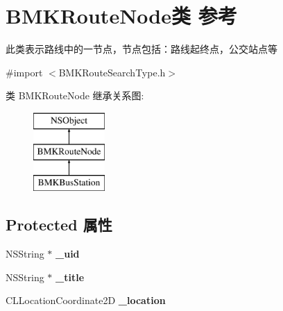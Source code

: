 \hypertarget{interface_b_m_k_route_node}{}\section{B\+M\+K\+Route\+Node类 参考}
\label{interface_b_m_k_route_node}


此类表示路线中的一节点，节点包括：路线起终点，公交站点等  




{\ttfamily \#import $<$B\+M\+K\+Route\+Search\+Type.\+h$>$}

类 B\+M\+K\+Route\+Node 继承关系图\+:\begin{figure}[H]
\begin{center}
\leavevmode
\includegraphics[height=3.000000cm]{interface_b_m_k_route_node}
\end{center}
\end{figure}
\subsection*{Protected 属性}
\begin{DoxyCompactItemize}
\item 
\hypertarget{interface_b_m_k_route_node_aea076ef4640413168162572460252743}{}N\+S\+String $\ast$ {\bfseries \+\_\+uid}\label{interface_b_m_k_route_node_aea076ef4640413168162572460252743}

\item 
\hypertarget{interface_b_m_k_route_node_a5fdb2b4ec6cda2a9b97796c6d2583ce5}{}N\+S\+String $\ast$ {\bfseries \+\_\+title}\label{interface_b_m_k_route_node_a5fdb2b4ec6cda2a9b97796c6d2583ce5}

\item 
\hypertarget{interface_b_m_k_route_node_af10ce80ceda0f352764ed59e98ba3deb}{}C\+L\+Location\+Coordinate2\+D {\bfseries \+\_\+location}\label{interface_b_m_k_route_node_af10ce80ceda0f352764ed59e98ba3deb}

\end{DoxyCompactItemize}
